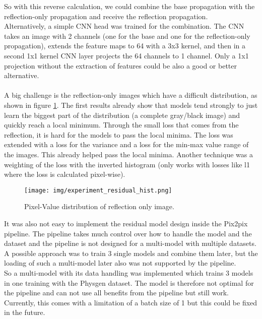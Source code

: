 		So with this reverse calculation, we could combine the base propagation with the reflection-only propagation and receive the reflection propagation.\\
		Alternatively, a simple CNN head was trained for the combination. The CNN takes an image with 2 channels (one for the base and one for the reflection-only propagation), extends the feature maps to 64 with a 3x3 kernel, and then in a second 1x1 kernel CNN layer projects the 64 channels to 1 channel. Only a 1x1 projection without the extraction of features could be also a good or better alternative.\\
		\\
		A big challenge is the reflection-only images which have a difficult distribution, as shown in figure \ref{fig:experiment_residual_hist}. The first results already show that models tend strongly to just learn the biggest part of the distribution (a complete gray/black image) and quickly reach a local minimum. Through the small loss that comes from the reflection, it is hard for the models to pass the local minima. The loss was extended with a loss for the variance and a loss for the min-max value range of the images. This already helped pass the local minima. Another technique was a weighting of the loss with the inverted histogram (only works with losses like l1 where the loss is calculated pixel-wise).
		
		\begin{figure}[H]
			\centering
			\texttt{[image: img/experiment\_residual\_hist.png]}
			\caption[Pixel-Value distribution of reflection only image.]{Pixel-Value distribution of reflection only image.}
			\label{fig:experiment_residual_hist}
		\end{figure}
		\FloatBarrier
		
		It was also not easy to implement the residual model design inside the Pix2pix pipeline. The pipeline takes much control over how to handle the model and the dataset and the pipeline is not designed for a multi-model with multiple datasets.\\
		A possible approach was to train 3 single models and combine them later, but the loading of such a multi-model later also was not supported by the pipeline.\\
		So a multi-model with its data handling was implemented which trains 3 models in one training with the Physgen dataset. The model is therefore not optimal for the pipeline and can not use all benefits from the pipeline but still work. Currently, this comes with a limitation of a batch size of 1 but this could be fixed in the future.
		
